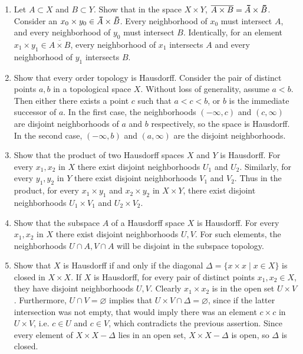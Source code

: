 \documentclass[12pt,letterpaper]{article}
\newcommand{\n}{\break}
\let\emptyset\varnothing
\newcommand{\WLOG}{Without loss of generality}
\newcommand\thickbar[1]{\accentset{\rule{.4em}{.8pt}}{#1}}
\let\bar\thickbar
\begin{document}
\begin{enumerate}
\begin{enumerate}
    \end{enumerate}
  \item Let $A\subset X$ and $B\subset Y$. Show that in the space $X\times Y$, $\overline{A\times B}=\bar{A}\times\bar{B}$.\n
    \indent Consider an $x_0\times y_0\in \bar{A} \times \bar{B}$. Every neighborhood of $x_0$ must intersect $A$, and every neighborhood of $y_0$ must intersect $B$. Identically, for an element $x_1\times y_1\in\overline{A\times B}$, every neighborhood of $x_1$ intersects $A$ and every neighborhood of $y_1$ intersects $B$. 
  \item Show that every order topology is Hausdorff.\n
    \indent Consider the pair of distinct points $a,b$ in a topological space $X$. \WLOG, assume $a<b$. Then either there exists a point $c$ such that $a<c<b$, or $b$ is the immediate successor of $a$. In the first case, the neighborhoods $(-\infty, c)$ and $(c,\infty)$ are disjoint neighborhoods of $a$ and $b$ respectively, so the space is Hausdorff. In the second case, $(-\infty, b)$ and $(a,\infty)$ are the disjoint neighborhoods. 
  \item Show that the product of two Hausdorff spaces $X$ and $Y$ is Hausdorff.\n
    \indent For every $x_1,x_2$ in $X$ there exist disjoint neighborhoods $U_1$ and $U_2$. Similarly, for every $y_1,y_2$ in $Y$ there exist disjoint neighborhoods $V_1$ and $V_2$. Thus in the product, for every $x_1\times y_1$ and $x_2\times y_2$ in $X\times Y$, there exist disjoint neighborhoods $U_1\times V_1$ and $U_2\times V_2$.
  \item Show that the subspace $A$ of a Hausdorff space $X$ is Hausdorff.\n
    \indent For every $x_1,x_2$ in $X$ there exist disjoint neighborhoods $U,V$. For such elements, the neighborhoods $U\cap A, V\cap A$ will be disjoint in the subspace topology.
  \item Show that $X$ is Hausdorff if and only if the diagonal $\Delta = \{x\times x\; |\; x\in X\}$ is closed in $X\times X$.\hspace{5in}\n
    \indent If $X$ is Hausdorff, for every pair of distinct points $x_1,x_2\in X$, they have disjoint neighborhoods $U,V$. Clearly $x_1 \times x_2$ is in the open set $U\times V$. Furthermore, $U\cap V=\emptyset$ implies that $U\times V \cap \Delta=\emptyset$, since if the latter intersection was not empty, that would imply there was an element $c\times c$ in $U\times V$, i.e. $c\in U$ and $c\in V$, which contradicts the previous assertion. Since every element of $X\times X - \Delta$ lies in an open set, $X\times X - \Delta$ is open, so $\Delta$ is closed.\n

\end{enumerate}
\end{document}

